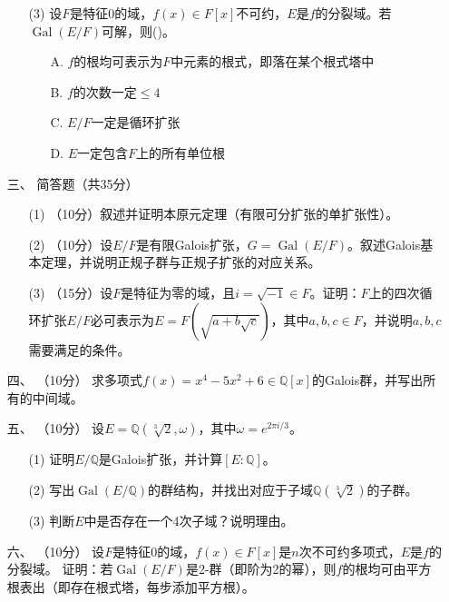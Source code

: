 \begin{itemize}
\begin{itemize}
\item[(3)] 设$F$是特征$0$的域，$f(x)\in F[x]$不可约，$E$是$f$的分裂域。若$\operatorname{Gal}(E/F)$可解，则(\quad)。
\begin{itemize}
\item[A.] $f$的根均可表示为$F$中元素的根式，即落在某个根式塔中
\item[B.] $f$的次数一定$\le 4$
\item[C.] $E/F$一定是循环扩张
\item[D.] $E$一定包含$F$上的所有单位根
\end{itemize}
\end{itemize}

\item[三、] 简答题（共35分）
\begin{itemize}
\item[(1)]（10分）叙述并证明本原元定理（有限可分扩张的单扩张性）。

\item[(2)]（10分）设$E/F$是有限Galois扩张，$G=\operatorname{Gal}(E/F)$。叙述Galois基本定理，并说明正规子群与正规子扩张的对应关系。

\item[(3)]（15分）设$F$是特征为零的域，且$i=\sqrt{-1}\in F$。证明：$F$上的四次循环扩张$E/F$必可表示为$E=F\left(\sqrt{a+b\sqrt{c}}\right)$，其中$a,b,c\in F$，并说明$a,b,c$需要满足的条件。
\end{itemize}

\item[四、]（10分）
求多项式$f(x)=x^{4}-5x^{2}+6\in \mathbb{Q}[x]$的Galois群，并写出所有的中间域。

\item[五、]（10分）
设$E=\mathbb{Q}(\sqrt[3]{2},\omega)$，其中$\omega=e^{2\pi i/3}$。
\begin{enumerate}
\item[(1)] 证明$E/\mathbb{Q}$是Galois扩张，并计算$[E:\mathbb{Q}]$。
\item[(2)] 写出$\operatorname{Gal}(E/\mathbb{Q})$的群结构，并找出对应于子域$\mathbb{Q}(\sqrt[3]{2})$的子群。
\item[(3)] 判断$E$中是否存在一个4次子域？说明理由。
\end{enumerate}

\item[六、]（10分）
设$F$是特征$0$的域，$f(x)\in F[x]$是$n$次不可约多项式，$E$是$f$的分裂域。
证明：若$\operatorname{Gal}(E/F)$是2-群（即阶为2的幂），则$f$的根均可由平方根表出（即存在根式塔，每步添加平方根）。


\end{itemize}
